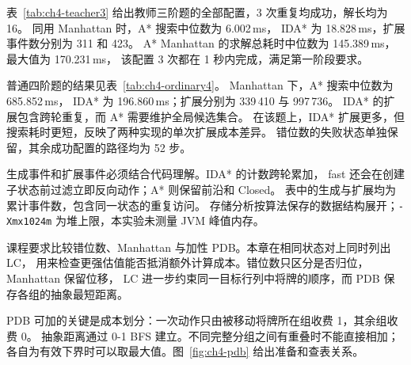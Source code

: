 表~\ref{tab:ch4-teacher3} 给出教师三阶题的全部配置，3 次重复均成功，解长均为 16。
同用 Manhattan 时，A* 搜索中位数为 6.002\,ms，
IDA* 为 18.828\,ms，扩展事件数分别为 311 和 423。
A* Manhattan 的求解总耗时中位数为 145.389\,ms，
最大值为 170.231\,ms，
该配置 3 次都在 1 秒内完成，满足第一阶段要求。

普通四阶题的结果见表~\ref{tab:ch4-ordinary4}。
Manhattan 下，A* 搜索中位数为 685.852\,ms，
IDA* 为 196.860\,ms；扩展分别为 339\,410 与 997\,736。
IDA* 的扩展包含跨轮重复，而 A* 需要维护全局候选集合。
在该题上，IDA* 扩展更多，但搜索耗时更短，反映了两种实现的单次扩展成本差异。
错位数的失败状态单独保留，其余成功配置的路径均为 52 步。

生成事件和扩展事件必须结合代码理解。IDA* 的计数跨轮累加，
fast 还会在创建子状态前过滤立即反向动作；A* 则保留前沿和 Closed。
表中的生成与扩展均为累计事件数，包含同一状态的重复访问。
存储分析按算法保存的数据结构展开；\texttt{-Xmx1024m} 为堆上限，本实验未测量 JVM 峰值内存。
\FloatBarrier

\par\vspace{2bp}

课程要求比较错位数、Manhattan 与加性 PDB。本章在相同状态对上同时列出 LC，
用来检查更强估值能否抵消额外计算成本。错位数只区分是否归位，Manhattan 保留位移，
LC 进一步约束同一目标行列中将牌的顺序，而 PDB 保存各组的抽象最短距离。

PDB 可加的关键是成本划分：一次动作只由被移动将牌所在组收费 1，其余组收费 0。
抽象距离通过 0-1 BFS 建立。不同完整分组之间有重叠时不能直接相加；
各自为有效下界时可以取最大值。图~\ref{fig:ch4-pdb} 给出准备和查表关系。
\FloatBarrier

\par\vspace{2bp}

